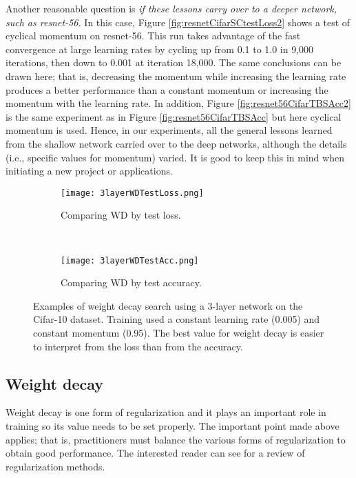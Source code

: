 \documentclass{article} %
\begin{document}
Another reasonable question is \emph{if these lessons carry over to a deeper network, such as resnet-56.}   In this case, Figure \ref{fig:resnetCifarSCtestLoss2} shows a test of cyclical momentum on resnet-56.  This run takes advantage of the fast convergence at large learning rates by cycling up from 0.1 to 1.0 in 9,000 iterations, then down to 0.001 at iteration 18,000.   The same conclusions can be drawn here; that is, decreasing the momentum while increasing the learning rate produces a better performance than a constant momentum or increasing the momentum with the learning rate.  In addition, Figure \ref{fig:resnet56CifarTBSAcc2} is the same experiment as in Figure \ref{fig:resnet56CifarTBSAcc} but here cyclical momentum is used.  Hence, in our experiments, all the general lessons learned from  the shallow network carried over to the deep networks, although the details (i.e., specific values for momentum) varied.  It is good to keep this in mind when initiating a new project or applications. 



\begin{figure}[tbh]
	\centering
	\begin{subfigure}[b]{0.5\textwidth}
		\texttt{[image: 3layerWDTestLoss.png]}
		\caption{Comparing WD by test loss.}
		\label{fig:3layerWDTestLoss}       %
	\end{subfigure}
	\quad
	\hfill
	~ %
	\centering
	\begin{subfigure}[b]{0.43\textwidth}
		\texttt{[image: 3layerWDTestAcc.png]}
		\caption{Comparing WD by test accuracy.}
		\label{fig:3layerWDTestAcc}       %
	\end{subfigure}
	\caption{Examples of weight decay search using a 3-layer network on the Cifar-10 dataset.  Training used a constant learning rate (0.005) and constant momentum (0.95).  The best value for weight decay is easier to interpret from the loss than from the accuracy.}
\label{fig:3layerWD}
\vspace{-5pt}	
\end{figure}


\subsection{Weight decay}
\label{sec:WDreg}


Weight decay is one form of regularization and it plays an important role in training so its value needs to be set properly.  The important point made above applies; that is, practitioners must balance the various forms of regularization to obtain good performance.  The interested reader can see \cite{kukavcka2017regularization} for a review of regularization methods.  
\end{document}
